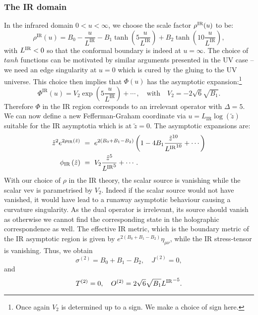 \documentclass[prd,reprint,a4paper,showpacs,superscriptaddress,11pt,onecolumn,nofootinbib]{revtex4-1}
\renewcommand{\(}{\left(}
\renewcommand{\)}{\right)}
\newcommand{\6}{\partial}
\begin{document}
\subsubsection{The IR domain} 
In the infrared domain $0 < u < \infty$, we choose the scale factor $\rho^{\rm IR}(u)$ to be:
\begin{equation}\label{rhoIR} 
\rho^{\text{IR}}\left(u\right) =  B_0 - \dfrac{u}{L^{\text{IR}}} - B_1 \tanh\left(5 \dfrac{u}{L^{\text{IR}}}\right) + B_2 \tanh\left(10  \dfrac{u}{L^{\text{IR}}}\right),
\end{equation}
with $L^{\rm IR} < 0$ so that the conformal boundary is indeed at $u = \infty$. The choice of $tanh$ functions can be motivated by similar arguments presented in the UV case -- we need an edge singularity at $u= 0$ which is cured by the gluing to the UV universe.  This choice then implies that $\Phi(u)$ has the asymptotic expansion:\footnote{Once again $V_2$ is determined up to a sign. We make a choice of sign here.}
\begin{equation}\label{eqn:irrelirphi}
\Phi^{\text{IR}}\left(u\right) =  V_2 \exp\left(5 \dfrac{u}{L^{\text{IR}}}\right) + \cdots \,, \quad \text{with} \quad V_2 =  -2\sqrt{6}\sqrt{B_1}.
\end{equation}
Therefore $\Phi$ in the IR region corresponds to an irrelevant operator with $\Delta = 5$. We can now define a new Fefferman-Graham coordinate via $u = L_{\text{IR}} \log\left(\tilde{z}\right)$ suitable for the IR asymptotia which is at $\tilde{z}=0$. The asymptotic expansions are:
\begin{align}
\tilde{z}^2 e^{2 \rho_{\text{IR}}\left(\tilde{z}\right)} ~ &= ~ e^{2 \left(B_0 + B_1 -B_2 \right)} \left(1 - 4 B_1\frac{\tilde{z}^{10}}{{L^{\rm IR}}^{10}}  + \cdots\right) \\
\phi_{\text{IR}}\left(\tilde{z}\right) ~ &= ~ V_2 \frac{\tilde{z}^5}{{L^{\rm IR}}^5} + \cdots \, .
\end{align}
With our choice of $\rho$ in the IR theory, the scalar source is vanishing while the scalar vev is parametrised by $V_2$. Indeed if the scalar source would not have vanished, it would have lead to a runaway asymptotic behaviour causing a curvature singularity. As the dual operator is irrelevant, its source should vanish as otherwise we cannot find the corresponding state in the holographic correspondence as well. The effective IR metric, which is the boundary metric of the IR asymptotic region is given by 
$e^{2 \left(B_0 + B_1 - B_2 \right)} \eta_{\mu\nu}$, while the IR stress-tensor is vanishing. Thus, we obtain
\begin{equation}\label{sourceIR}
\sigma^{(2)} = B_0 + B_1 - B_2, \quad J^{(2)} = 0,
\end{equation}
and 
\begin{equation}\label{vevIR}
T^{(2)} = 0, \quad O^{(2)} = 2\sqrt{6}\sqrt{B_1}{L^{\rm IR}}^{-5}.
\end{equation}
\end{document}
